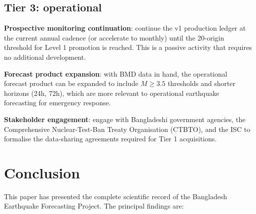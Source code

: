 \documentclass[10pt,a4paper,twocolumn]{article}
\begin{document}
\subsection{Tier 3: operational}

\textbf{Prospective monitoring continuation}: continue the v1 production ledger at the current annual cadence (or accelerate to monthly) until the 20-origin threshold for Level 1 promotion is reached. This is a passive activity that requires no additional development.

\textbf{Forecast product expansion}: with BMD data in hand, the operational forecast product can be expanded to include $M\geq3.5$ thresholds and shorter horizons (24h, 72h), which are more relevant to operational earthquake forecasting for emergency response.

\textbf{Stakeholder engagement}: engage with Bangladeshi government agencies, the Comprehensive Nuclear-Test-Ban Treaty Organisation (CTBTO), and the ISC to formalise the data-sharing agreements required for Tier 1 acquisitions.

\section{Conclusion}\label{sec:conclusion}

This paper has presented the complete scientific record of the Bangladesh Earthquake Forecasting Project. The principal findings are:
\end{document}
